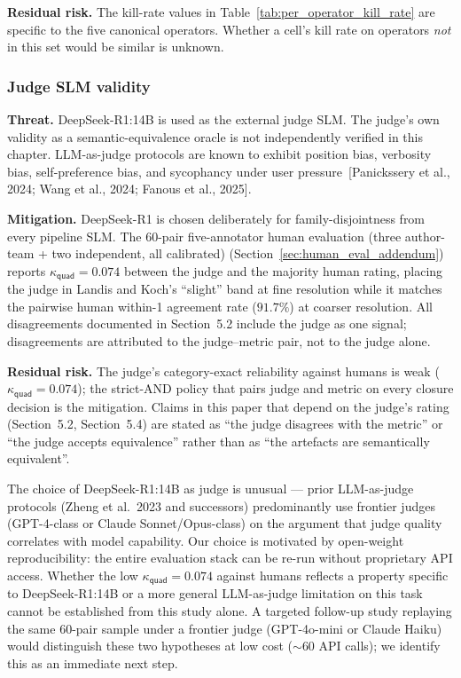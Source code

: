 \textbf{Residual risk.} The kill-rate values in Table~\ref{tab:per_operator_kill_rate} are specific to the five canonical operators. Whether a cell's kill rate on operators \emph{not} in this set would be similar is unknown.

\subsubsection{Judge SLM validity}

\textbf{Threat.} DeepSeek-R1:14B is used as the external judge SLM. The judge's own validity as a semantic-equivalence oracle is not independently verified in this chapter. LLM-as-judge protocols are known to exhibit position bias, verbosity bias, self-preference bias, and sycophancy under user pressure~[Panickssery et al., 2024; Wang et al., 2024; Fanous et al., 2025].

\textbf{Mitigation.} DeepSeek-R1 is chosen deliberately for family-disjointness from every pipeline SLM. The 60-pair five-annotator human evaluation (three author-team + two independent, all calibrated) (Section~\ref{sec:human_eval_addendum}) reports $\kappa_{\textsf{quad}} = 0.074$ between the judge and the majority human rating, placing the judge in Landis and Koch's ``slight'' band at fine resolution while it matches the pairwise human within-1 agreement rate ($91.7\%$) at coarser resolution. All disagreements documented in Section~5.2 include the judge as one signal; disagreements are attributed to the judge--metric pair, not to the judge alone.

\textbf{Residual risk.} The judge's category-exact reliability against humans is weak ($\kappa_{\textsf{quad}} = 0.074$); the strict-AND policy that pairs judge and metric on every closure decision is the mitigation. Claims in this paper that depend on the judge's rating (Section~5.2, Section~5.4) are stated as ``the judge disagrees with the metric'' or ``the judge accepts equivalence'' rather than as ``the artefacts are semantically equivalent''.

The choice of DeepSeek-R1:14B as judge is unusual --- prior LLM-as-judge protocols (Zheng et al.\ 2023 and successors) predominantly use frontier judges (GPT-4-class or Claude Sonnet/Opus-class) on the argument that judge quality correlates with model capability. Our choice is motivated by open-weight reproducibility: the entire evaluation stack can be re-run without proprietary API access. Whether the low $\kappa_{\textsf{quad}} = 0.074$ against humans reflects a property specific to DeepSeek-R1:14B or a more general LLM-as-judge limitation on this task cannot be established from this study alone. A targeted follow-up study replaying the same 60-pair sample under a frontier judge (GPT-4o-mini or Claude Haiku) would distinguish these two hypotheses at low cost (${\sim}60$ API calls); we identify this as an immediate next step.

